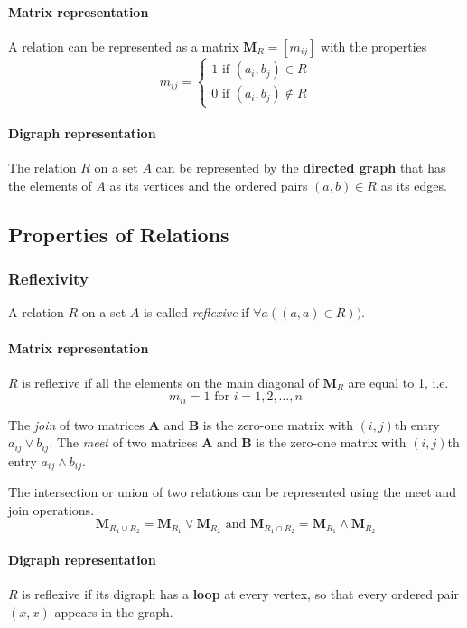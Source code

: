 \paragraph{Matrix representation}
A relation can be represented as a matrix \( \mathbf{M}_R = [m_{ij}] \) with the properties \[
m_{ij} = \begin{cases}	
1 \text{ if } (a_i,b_j) \in R \\
0 \text{ if } (a_i, b_j) \notin R
	\end{cases}
\]

\paragraph{Digraph representation}
The relation \( R \) on a set \( A \) can be represented by the \textbf{directed graph} that has the elements of \( A \) as its vertices and the ordered pairs \( (a,b) \in R \) as its edges.

\subsection{Properties of Relations}
\subsubsection{Reflexivity} A relation \( R \) on a set \( A \) is called \emph{reflexive} if \( \forall a ((a,a) \in R)) \).

\paragraph{Matrix representation} \( R \) is reflexive if all the elements on the main diagonal of \( \mathbf{M}_R \) are equal to 1, i.e.\ \[
m_{ii} = 1 \text{ for } i = 1,2, \ldots , n 	
\]

The \emph{join} of two matrices \( \mathbf{A} \) and \( \mathbf{B} \) is the zero-one matrix with \( (i,j) \)th entry \( a_{ij} \vee b_{ij}\).
The \emph{meet} of two matrices \( \mathbf{A} \) and \( \mathbf{B} \) is the zero-one matrix with \( (i,j) \)th entry \( a_{ij} \wedge b_{ij}\).

The intersection or union of two relations can be represented using the meet and join operations. \[
	\mathbf{M}_{R_1 \cup R_2} = \mathbf{M}_{R_1} \vee \mathbf{M}_{R_2} \text{ and } \mathbf{M}_{R_1 \cap R_2} = \mathbf{M}_{R_1} \wedge \mathbf{M}_{R_2}
\]

\paragraph{Digraph representation}
\( R \) is reflexive if its digraph has a \textbf{loop} at every vertex, so that every ordered pair \( (x,x) \) appears in the graph.



